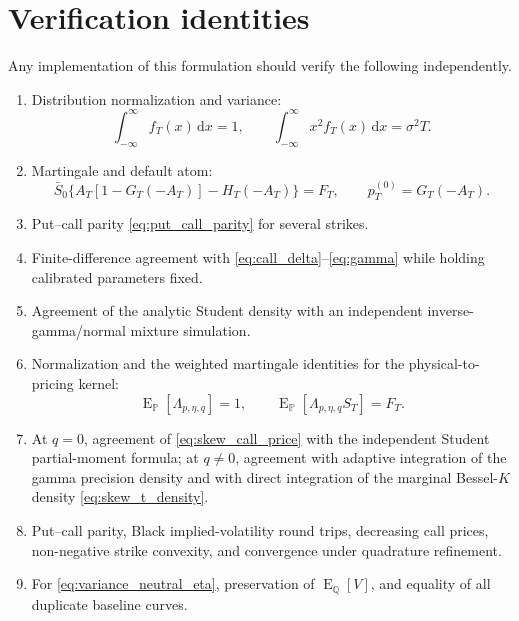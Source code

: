 \documentclass[11pt,a4paper]{article}
\DeclareMathOperator{\E}{E}
\newcommand{\dd}{\,\mathrm{d}}
\newcommand{\cdf}{G}
\begin{document}
\section{Verification identities}

Any implementation of this formulation should verify the following independently.
\begin{enumerate}
  \item Distribution normalization and variance:
  \[
    \int_{-\infty}^{\infty}f_T(x)\dd x=1,
    \qquad
    \int_{-\infty}^{\infty}x^2f_T(x)\dd x=\sigma^2T.
  \]
  \item Martingale and default atom:
  \[
    \bar S_0\{A_T[1-\cdf_T(-A_T)]-H_T(-A_T)\}=F_T,
    \qquad p_T^{(0)}=\cdf_T(-A_T).
  \]
  \item Put--call parity \eqref{eq:put_call_parity} for several strikes.
  \item Finite-difference agreement with \eqref{eq:call_delta}--\eqref{eq:gamma}
  while holding calibrated parameters fixed.
  \item Agreement of the analytic Student density with an independent
  inverse-gamma/normal mixture simulation.
  \item Normalization and the weighted martingale identities for the
  physical-to-pricing kernel:
  \[
    \E_{\mathbb P}[\Lambda_{p,\eta,q}]=1,\qquad
    \E_{\mathbb P}[\Lambda_{p,\eta,q}S_T]=F_T.
  \]
  \item At $q=0$, agreement of
  \eqref{eq:skew_call_price} with the independent Student partial-moment
  formula; at $q\ne0$, agreement with adaptive integration of the gamma
  precision density and with direct integration of the marginal Bessel-$K$
  density \eqref{eq:skew_t_density}.
  \item Put--call parity, Black implied-volatility round trips, decreasing
  call prices, non-negative strike convexity, and convergence under
  quadrature refinement.
  \item For \eqref{eq:variance_neutral_eta}, preservation of
  $\E_{\mathbb Q}[V]$, and equality of all duplicate baseline curves.
\end{enumerate}
\end{document}
